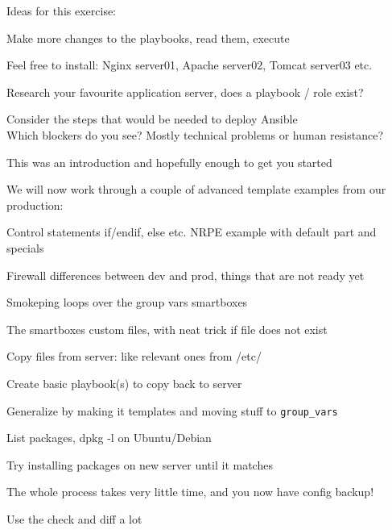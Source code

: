 \documentclass[18pt,landscape,a4paper,footrule]{foils}
\begin{document}
Ideas for this exercise:
\begin{list2}
\item Make more changes to the playbooks, read them, execute
\item Feel free to install: Nginx server01, Apache server02, Tomcat server03 etc.
\item Research your favourite application server, does a playbook / role exist?
\item Consider the steps that would be needed to deploy Ansible\\
Which blockers do you see? Mostly technical problems or human resistance?
\end{list2}

\centerline{This was an introduction and hopefully enough to get you started}


We will now work through a couple of advanced template examples from our production:
\begin{list2}
\item Control statements if/endif, else etc. NRPE example with default part and specials
\item Firewall differences between dev and prod, things that are not ready yet
\item Smokeping loops over the group vars smartboxes
\item The smartboxes custom files, with neat trick if file does not exist
\end{list2}


\begin{list2}
\item Copy files from server: like relevant ones from /etc/
\item Create basic playbook(s) to copy back to server
\item Generalize by making it templates and moving stuff to \verb+group_vars+
\item List packages, dpkg -l on Ubuntu/Debian
\item Try installing packages on new server until it matches
\item The whole process takes very little time, and you now have config backup!
\end{list2}

\centerline{Use the check and diff a lot \smiley}


\end{document}
